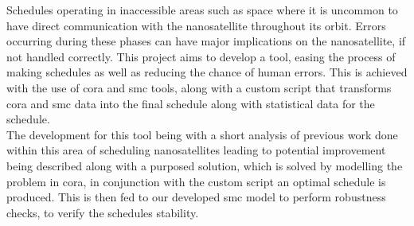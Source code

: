 Schedules operating in inaccessible areas such as space where it is uncommon to have direct communication with the nanosatellite throughout its orbit. Errors occurring during these phases can have major implications on the nanosatellite, if not handled correctly. This project aims to develop a tool, easing the process of making schedules as well as reducing the chance of human errors. This is achieved with the use of \acrshort{cora} and \acrshort{smc} tools, along with a custom script that transforms \acrshort{cora} and \acrshort{smc} data into the final schedule along with statistical data for the schedule.\\

The development for this tool being with a short analysis of previous work done within this area of scheduling nanosatellites leading to potential improvement being described along with a purposed solution, which is solved by modelling the problem in \acrshort{cora}, in conjunction with the custom script an optimal schedule is produced. This is then fed to our developed \acrshort{smc} model to perform robustness checks, to verify the schedules stability.
\glsresetall